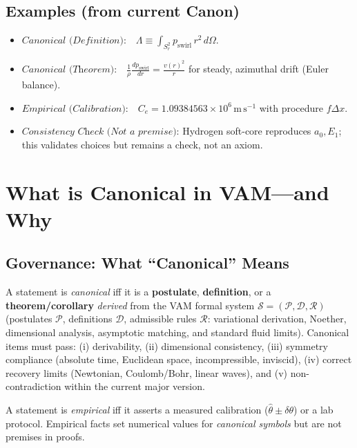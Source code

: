 \documentclass[11pt, a4paper]{article}
\begin{document}
    \subsection*{Examples (from current Canon)}
    \begin{itemize}
        \item \(\displaystyle \textit{Canonical (Definition):}\quad \Lambda \equiv \int_{S_r^2} p_{\text{swirl}}\,r^2\,d\Omega.\)
        \item \(\displaystyle \textit{Canonical (Theorem):}\quad \frac{1}{\rho}\frac{dp_{\text{swirl}}}{dr}=\frac{v(r)^2}{r}\) for steady, azimuthal drift (Euler balance).
        \item \(\displaystyle \textit{Empirical (Calibration):}\quad C_e=1.09384563\times10^{6}\,\mathrm{m\,s^{-1}}\) with procedure \(f\Delta x\).
        \item \(\displaystyle \textit{Consistency Check (Not a premise):}\) Hydrogen soft-core reproduces \(a_0,E_1\); this validates choices but remains a check, not an axiom.
    \end{itemize}

    \section*{What is Canonical in VAM—and Why}

    \subsection*{Governance: What “Canonical” Means}
    A statement is \emph{canonical} iff it is a \textbf{postulate}, \textbf{definition}, or a \textbf{theorem/corollary} \emph{derived} from the VAM formal system
    \(\mathcal{S}=(\mathcal{P},\mathcal{D},\mathcal{R})\)
    (postulates \(\mathcal{P}\), definitions \(\mathcal{D}\), admissible rules \(\mathcal{R}\): variational derivation, Noether, dimensional analysis, asymptotic matching, and standard fluid limits). Canonical items must pass: (i) derivability, (ii) dimensional consistency, (iii) symmetry compliance (absolute time, Euclidean space, incompressible, inviscid), (iv) correct recovery limits (Newtonian, Coulomb/Bohr, linear waves), and (v) non-contradiction within the current major version.

    A statement is \emph{empirical} iff it asserts a measured calibration (\( \hat{\theta}\pm\delta\theta\)) or a lab protocol. Empirical facts set numerical values for \emph{canonical symbols} but are not premises in proofs.
\end{document}

